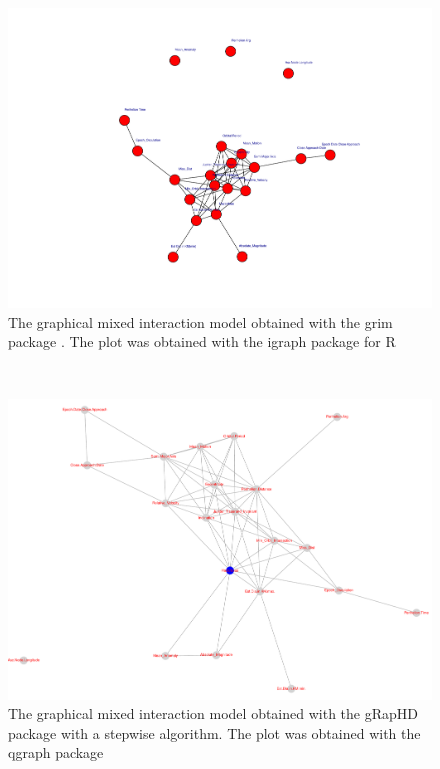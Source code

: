 \documentclass[12pt,%
               a4paper,%
               oneside,openany,%
               titlepage,%
               headinclude,footinclude,%
               BCOR5mm,%
               cleardoublepage=empty,%
               tablecaptionabove,%
               floatperchapter,
               ]{scrreprt}                 %
\begin{document}
\begin{landscape}
\begin{figure}
\begin{center}
\includegraphics[width=1.5\textheight]{Figures/mmod.pdf}
\caption{The graphical mixed interaction model obtained with the grim package \cite{hojsgaard2012graphical}. The plot was obtained with the igraph package for R \cite{igraph} }
\label{mmod}
\end{center}
\end{figure}
\end{landscape}
\\
\begin{landscape}
\begin{figure}
\begin{center}
\includegraphics[width=1.5\textheight]{Figures/minforest.pdf}
\caption{The graphical mixed interaction model obtained with the gRapHD package \cite{de2009high} with a stepwise algorithm. The plot was obtained with the qgraph \cite{qgraph} package }
\label{minforest}
\end{center}
\end{figure}
\end{landscape}
\end{document}
